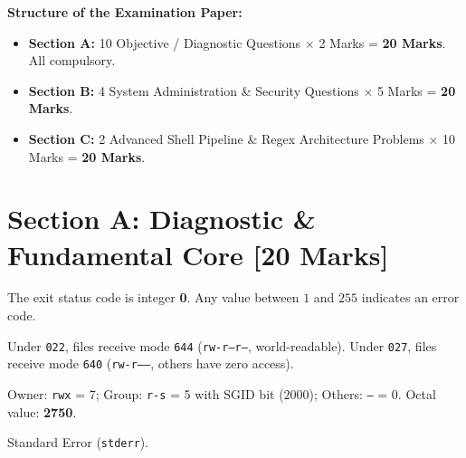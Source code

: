 
\begin{markingrubric}
\textbf{Structure of the Examination Paper:}
\begin{itemize}[leftmargin=1.5em, itemsep=1pt]
    \item \textbf{Section A:} 10 Objective / Diagnostic Questions $\times$ 2 Marks = \textbf{20 Marks}. All compulsory.
    \item \textbf{Section B:} 4 System Administration \& Security Questions $\times$ 5 Marks = \textbf{20 Marks}.
    \item \textbf{Section C:} 2 Advanced Shell Pipeline \& Regex Architecture Problems $\times$ 10 Marks = \textbf{20 Marks}.
\end{itemize}
\end{markingrubric}

\section*{Section A: Diagnostic \& Fundamental Core [20 Marks]}

\begin{examsol}
The exit status code is integer \textbf{0}. Any value between $1$ and $255$ indicates an error code.
\end{examsol}

\begin{examsol}
Under \texttt{022}, files receive mode \texttt{644} (\texttt{rw-r--r--}, world-readable). Under \texttt{027}, files receive mode \texttt{640} (\texttt{rw-r-----}, others have zero access).
\end{examsol}

\begin{examsol}
Owner: \texttt{rwx} = 7; Group: \texttt{r-s} = 5 with SGID bit ($2000$); Others: \texttt{---} = 0. Octal value: \textbf{2750}.
\end{examsol}

\begin{examsol}
Standard Error (\texttt{stderr}).
\end{examsol}

